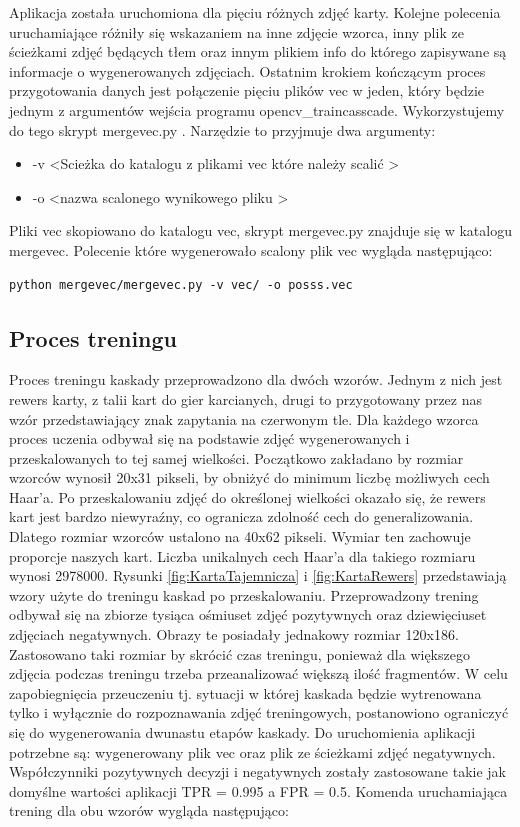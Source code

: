 Aplikacja została uruchomiona dla pięciu różnych zdjęć karty. Kolejne polecenia uruchamiające różniły się wskazaniem na inne zdjęcie wzorca, inny plik ze ścieżkami zdjęć będących tłem oraz innym plikiem info do którego zapisywane są informacje o wygenerowanych zdjęciach.
Ostatnim krokiem kończącym proces przygotowania danych jest połączenie pięciu plików vec w jeden, który będzie jednym z argumentów wejścia programu opencv\_traincasscade. Wykorzystujemy do tego skrypt mergevec.py \cite{mergeVec}. Narzędzie to przyjmuje dwa argumenty:
\begin{itemize}
	\item -v \textless Scieżka do katalogu z plikami vec które należy scalić \textgreater
	\item -o \textless nazwa scalonego wynikowego pliku \textgreater
\end{itemize}
Pliki vec skopiowano do katalogu vec, skrypt mergevec.py znajduje się w katalogu mergevec. Polecenie które wygenerowało scalony plik vec wygląda następująco: 
\begin{lstlisting}
python mergevec/mergevec.py -v vec/ -o posss.vec
\end{lstlisting}
\subsection{Proces treningu}

Proces treningu kaskady przeprowadzono dla dwóch wzorów. Jednym z nich jest rewers karty, z talii kart do gier karcianych, drugi to przygotowany przez nas wzór przedstawiający znak zapytania na czerwonym tle. Dla każdego wzorca proces uczenia odbywał się na podstawie zdjęć wygenerowanych i przeskalowanych to tej samej wielkości. Początkowo zakładano by rozmiar wzorców wynosił 20x31 pikseli, by obniżyć do minimum liczbę możliwych cech Haar'a.
Po przeskalowaniu zdjęć do określonej wielkości okazało się, że rewers kart jest bardzo niewyraźny, co ogranicza zdolność cech do generalizowania. Dlatego rozmiar wzorców ustalono na 40x62 pikseli. Wymiar ten zachowuje proporcje naszych kart. Liczba unikalnych cech Haar'a dla takiego rozmiaru wynosi 2978000. Rysunki \ref{fig:KartaTajemnicza} i \ref{fig:KartaRewers} przedstawiają wzory użyte do treningu kaskad po przeskalowaniu. Przeprowadzony trening odbywał się na zbiorze tysiąca ośmiuset zdjęć pozytywnych oraz dziewięciuset zdjęciach negatywnych. Obrazy te posiadały jednakowy rozmiar 120x186. Zastosowano taki rozmiar by skrócić czas treningu, ponieważ dla większego zdjęcia podczas treningu trzeba przeanalizować większą ilość fragmentów. W celu zapobiegnięcia przeuczeniu tj. sytuacji w której kaskada będzie wytrenowana tylko i wyłącznie do rozpoznawania zdjęć treningowych, postanowiono ograniczyć się do wygenerowania dwunastu etapów kaskady. Do uruchomienia aplikacji potrzebne są: wygenerowany plik vec oraz plik ze ścieżkami zdjęć negatywnych. Współczynniki pozytywnych decyzji i negatywnych zostały zastosowane takie jak domyślne wartości aplikacji TPR = 0.995 a FPR = 0.5. Komenda uruchamiająca trening dla obu wzorów wygląda następująco:

